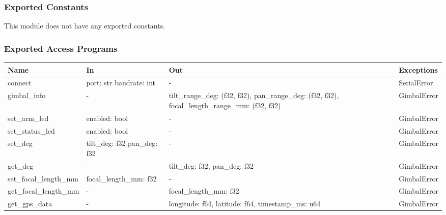 \documentclass[12pt, titlepage]{article}
\begin{document}
\subsubsection{Exported Constants}

This module does not have any exported constants.

\subsubsection{Exported Access Programs}

\begin{center}
  \begin{tabular}{p{3cm} p{4cm} p{4cm} p{3.5cm}}
    \hline
    \textbf{Name}          & \textbf{In}                           & \textbf{Out}                                                                                    & \textbf{Exceptions} \\
    \hline
    connect                & port: str \newline baudrate: int      & -                                                                                               & SerialError         \\
    \hline
    gimbal\_info           & -                                     & tilt\_range\_deg: (f32, f32), pan\_range\_deg: (f32, f32), focal\_length\_range\_mm: (f32, f32) & GimbalError         \\
    \hline
    set\_arm\_led          & enabled: bool                         & -                                                                                               & GimbalError         \\
    \hline
    set\_status\_led       & enabled: bool                         & -                                                                                               & GimbalError         \\
    \hline
    set\_deg               & tilt\_deg: f32 \newline pan\_deg: f32 & -                                                                                               & GimbalError         \\
    \hline
    get\_deg               & -                                     & tilt\_deg: f32, pan\_deg: f32                                                                   & GimbalError         \\
    \hline
    set\_focal\_length\_mm & focal\_length\_mm: f32                & -                                                                                               & GimbalError         \\
    \hline
    get\_focal\_length\_mm & -                                     & focal\_length\_mm: f32                                                                          & GimbalError         \\
    \hline
    get\_gps\_data         & -                                     & longitude: f64, latitude: f64, timestamp\_ms: u64                                               & GimbalError         \\
    \hline
  \end{tabular}
\end{center}
\end{document}
